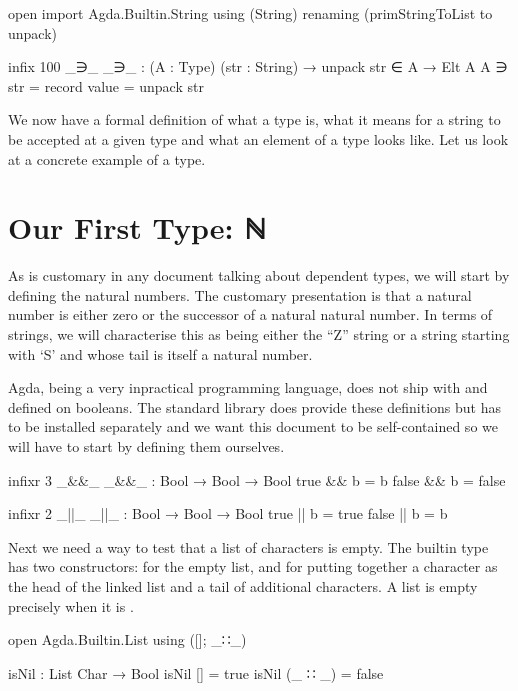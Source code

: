\documentclass[twocolumn]{article}
\begin{document}
\begin{code}
open import Agda.Builtin.String using (String)
  renaming (primStringToList to unpack)

infix 100 _∋_
_∋_ : (A : Type) (str : String) →
      {{unpack str ∈ A}} → Elt A
A ∋ str = record { value = unpack str }
\end{code}

We now have a formal definition of what a type is, what it means for a string
to be accepted at a given type and what an element of a type looks like.
Let us look at a concrete example of a type.

\section{Our First Type: ℕ}

As is customary in any document talking about dependent types, we will start
by defining the natural numbers. The customary presentation is that a natural
number is either zero or the successor of a natural natural number. In terms
of strings, we will characterise this as being either the ``Z'' string or a
string starting with `S' and whose tail is itself a natural number.

Agda, being a very inpractical programming language, does not ship with
\AF{\_\&\&\_} and \AF{\_||\_} defined on booleans.
The standard library does provide these definitions but has to be installed
separately and we want this document to be self-contained so we will have
to start by defining them ourselves.

\begin{code}
infixr 3 _&&_
_&&_ : Bool → Bool → Bool
true   && b = b
false  && b = false

infixr 2 _||_
_||_ : Bool → Bool → Bool
true   || b = true
false  || b = b
\end{code}

Next we need a way to test that a list of characters is empty.
The builtin type  has two constructors: \AIC{[]} for the
empty list, and  for putting together a character as the
head of the linked list and a tail of additional characters. A list is
empty precisely when it is \AIC{[]}.

\begin{code}
open Agda.Builtin.List using ([]; _∷_)

isNil : List Char → Bool
isNil []       = true
isNil (_ ∷ _)  = false
\end{code}
\end{document}
